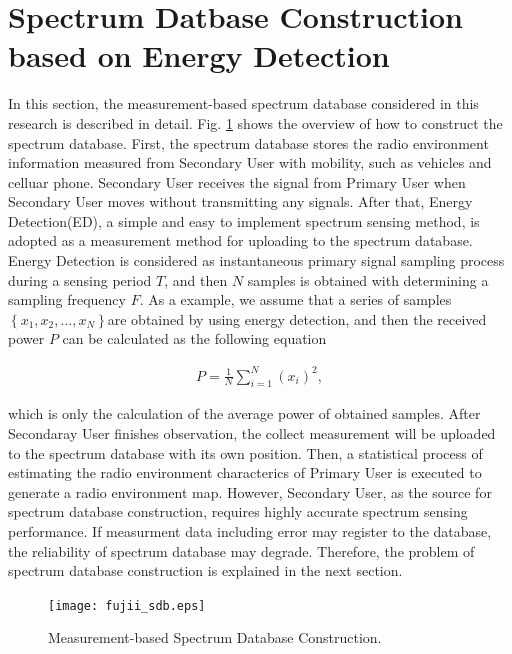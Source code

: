 \section{Spectrum Datbase Construction based on Energy Detection}
In this section, the measurement-based spectrum database considered in this research is described in detail. Fig. \ref{fig:fujii_sdb} shows the overview of how to construct the spectrum database. First, the spectrum database stores the radio environment information measured from Secondary User with mobility, such as vehicles and celluar phone. Secondary User receives the signal from Primary User when Secondary User moves without transmitting any signals. After that, Energy Detection(ED)\cite{ref:ED}, a simple and easy to implement spectrum sensing method, is adopted as a measurement method for uploading to the spectrum database. Energy Detection is considered as instantaneous primary signal sampling process during a sensing period $T$, and then $N$ samples is obtained with determining a sampling frequency $F$. As a example, we assume that a series of samples $\left\{x_1,x_2,...,x_N\right\}$are obtained by using energy detection, and then the received power $P$ can be calculated as the following equation

\begin{eqnarray}
P=\frac{1}{N}\sum_{i=1}^{N}(x_i)^2,
\end{eqnarray}

which is only the calculation of the average power of obtained samples.
After Secondaray User finishes observation, the collect measurement will be uploaded to the spectrum database with its own position. Then, a statistical process of estimating the radio environment characterics of Primary User is executed to generate a radio environment map. However, Secondary User, as the source for spectrum database construction, requires highly accurate spectrum sensing performance. If measurment data including error may register to the database, the reliability of spectrum database may degrade. Therefore, the problem of spectrum database construction is explained in the next section.

\begin{figure}[!htp]
\begin{center}
\texttt{[image: fujii\_sdb.eps]}
\caption{Measurement-based Spectrum Database Construction.}
\label{fig:fujii_sdb}
\end{center}
\end{figure}

